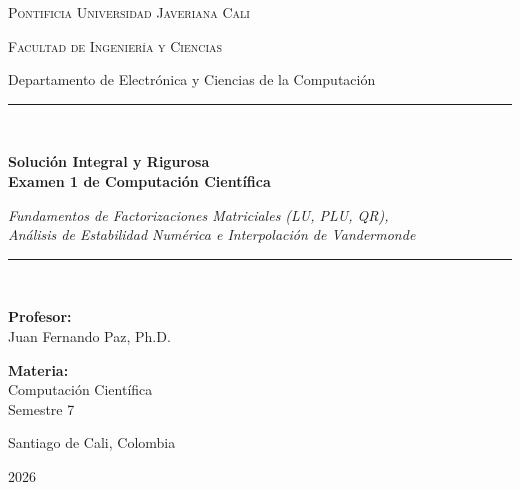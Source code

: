 \documentclass[11pt,a4paper]{article}
\theoremstyle{definition}
\theoremstyle{remark}
\begin{document}
\begin{titlepage}
    \centering
    \vspace*{0.8cm}
    {\scshape\LARGE Pontificia Universidad Javeriana Cali \par}
    \vspace{0.4cm}
    {\scshape\Large Facultad de Ingeniería y Ciencias \par}
    {\large Departamento de Electrónica y Ciencias de la Computación \par}
    \vspace{1.2cm}
    
    \rule{\linewidth}{1.5pt} \\[0.4cm]
    {\huge\bfseries\color{pujblue} Solución Integral y Rigurosa \\[0.2cm] 
    Examen 1 de Computación Científica \par}
    \vspace{0.3cm}
    {\Large\itshape Fundamentos de Factorizaciones Matriciales (LU, PLU, QR), \\[0.1cm]
    Análisis de Estabilidad Numérica e Interpolación de Vandermonde \par}
    \rule{\linewidth}{1.5pt} \\[1.5cm]
    
    \begin{minipage}[t]{0.48\textwidth}
        \large
        \textbf{Profesor:}\\
        Juan Fernando Paz, Ph.D.
    \end{minipage}
    \hfill
    \begin{minipage}[t]{0.48\textwidth}
        \begin{flushright}
            \large
            \textbf{Materia:}\\
            Computación Científica\\
            Semestre 7
        \end{flushright}
    \end{minipage}
    
    \vfill
    {\large Santiago de Cali, Colombia \par}
    {\large 2026 \par}
\end{titlepage}

\tableofcontents
\newpage

\end{document}
